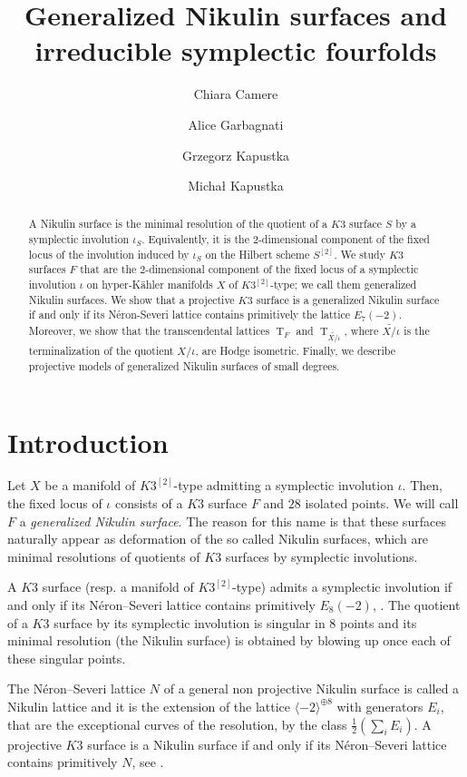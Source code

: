 \documentclass{amsart}
\title{Generalized Nikulin surfaces and irreducible symplectic fourfolds}
\author[C. Camere]{Chiara Camere}
\author[A. Garbagnati]{Alice Garbagnati}
\author[G. Kapustka]{Grzegorz Kapustka}
\author[M. Kapustka]{Micha\l{} Kapustka}
\theoremstyle{definition}
\numberwithin{equation}{section}
\numberwithin{equation}{section} \theoremstyle{definition}
\DeclareMathOperator{\T}{T}
\begin{document}
\maketitle

\begin{abstract} A Nikulin surface is the minimal resolution of the quotient of a $K3$ surface $S$ by a symplectic involution $\iota_S$. Equivalently, it is the $2$-dimensional component of the fixed locus of the involution induced by $\iota_S$ on the Hilbert scheme $S^{[2]}$.
    We study $K3$ surfaces $F$ that are the $2$-dimensional component of the fixed locus of a symplectic involution $\iota$ on hyper-K\"ahler manifolds $X$ of $K3^{[2]}$-type; we call them generalized Nikulin surfaces.
    We show that a projective $K3$ surface is a generalized Nikulin surface if and only if its N\'eron-Severi lattice contains primitively the lattice $E_7(-2)$. 
    Moreover, we show that the transcendental lattices $\T_F$ and $\T_{\widetilde{X/ \iota}}$, where $\widetilde{X/ \iota}$ is the terminalization of the quotient $X/\iota$, are Hodge isometric.
    Finally, we describe projective models of generalized Nikulin surfaces of small degrees.
\end{abstract}
\section{Introduction}
Let $X$ be a manifold of $K3^{[2]}$-type admitting a symplectic involution $\iota$.
Then, the fixed locus of $\iota$ consists of a $K3$ surface $F$ and $28$ isolated points.
We will call $F$ a \emph{generalized Nikulin surface}. The reason for this name is that these surfaces naturally appear as deformation of the so called Nikulin surfaces, which are minimal resolutions of quotients of $K3$ surfaces by symplectic involutions.

A $K3$ surface (resp. a manifold of $K3^{[2]}$-type) admits a symplectic involution if and only if its N\'eron--Severi lattice contains primitively $E_8(-2)$, \cite{vGS, C,Mon}. The quotient of a $K3$ surface by its symplectic involution is singular in 8 points and its minimal resolution (the Nikulin surface) is obtained by blowing up once each of these singular points.

The N\'eron--Severi lattice $N$ of a general non projective Nikulin surface is called a Nikulin lattice and it is the extension of the lattice $\langle -2\rangle^{\oplus 8}$  with generators $E_i$, that are the exceptional curves of the resolution,
by the class $\frac{1}{2}(\sum_i E_i)$. A projective $K3$ surface is a Nikulin surface if and only if its N\'eron--Severi lattice contains primitively $N$, see \cite{GS,N}.  
\end{document}

